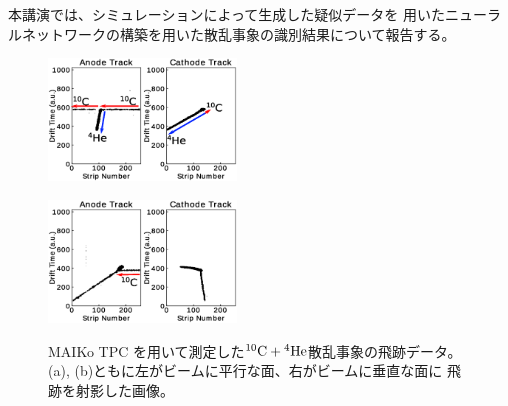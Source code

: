 \documentclass[12pt,a4paper]{jsarticle}
\begin{document}
本講演では、シミュレーションによって生成した疑似データを
用いたニューラルネットワークの構築を用いた散乱事象の識別結果について報告する。

\vspace*{-0.5\intextsep}
\begin{figure}[h]
  \begin{minipage}{0.5\hsize}
    \begin{center}
      \includegraphics[clip,width=50mm]{true.eps}
    \end{center}
    \vspace*{-1\intextsep}
    \label{fig:true}
  \end{minipage}
  \begin{minipage}{0.5\hsize}
    \begin{center}
      \includegraphics[clip,width=50mm]{false.eps}
    \end{center}
    \vspace*{-1\intextsep}
    \label{fig:false}
  \end{minipage}
  \vspace*{-0.7\intextsep}
  \caption{\small
    MAIKo TPC を用いて測定した${}^{10}\rm{C} + {}^{4}\rm{He}$散乱事象の飛跡データ。
    (a), (b)ともに左がビームに平行な面、右がビームに垂直な面に
    飛跡を射影した画像。
  }
\end{figure}
\end{document}
